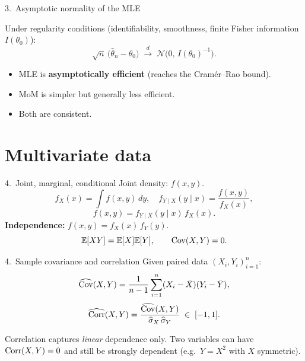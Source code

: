 \documentclass[aspectratio=169]{beamer}
\begin{document}
\begin{frame}{3.~Asymptotic normality of the MLE}
  \begin{thbox}
    Under regularity conditions (identifiability, smoothness, finite
    Fisher information $I(\theta_0)$):
    \[
      \sqrt{n}\,\bigl(\widehat{\theta}_n - \theta_0\bigr)
      \;\xrightarrow{d}\;
      \mathcal{N}\!\bigl(0,\, I(\theta_0)^{-1}\bigr).
    \]
  \end{thbox}
  \medskip
  \begin{itemize}
    \item MLE is \textbf{asymptotically efficient} (reaches the
          Cramér–Rao bound).
    \item MoM is simpler but generally less efficient.
    \item Both are consistent.
  \end{itemize}
\end{frame}

\section{Multivariate data}

\begin{frame}{4.~Joint, marginal, conditional}
  Joint density: $f(x, y)$.
  \[
    f_X(x) = \int f(x, y)\, dy, \quad
    f_{Y \mid X}(y \mid x) = \frac{f(x, y)}{f_X(x)},
  \]
  \[
    f(x, y) = f_{Y \mid X}(y \mid x)\, f_X(x).
  \]
  \medskip
  \textbf{Independence:} $f(x, y) = f_X(x)\, f_Y(y)$.
  \[
    \mathbb{E}[XY] = \mathbb{E}[X]\mathbb{E}[Y], \qquad
    \mathrm{Cov}(X, Y) = 0.
  \]
\end{frame}

\begin{frame}{4.~Sample covariance and correlation}
  Given paired data $(X_i, Y_i)_{i=1}^{n}$:
  \[
    \widehat{\mathrm{Cov}}(X, Y) = \frac{1}{n-1}\sum_{i=1}^{n}
      (X_i - \bar{X})(Y_i - \bar{Y}),
  \]
  \[
    \widehat{\mathrm{Corr}}(X, Y) =
      \frac{\widehat{\mathrm{Cov}}(X, Y)}{\widehat{\sigma}_X\, \widehat{\sigma}_Y}
      \;\in\; [-1, 1].
  \]
  \medskip
  \begin{warnbox}
    Correlation captures \emph{linear} dependence only. Two variables
    can have $\mathrm{Corr}(X, Y) = 0$ and still be strongly dependent
    (e.g.\ $Y = X^2$ with $X$ symmetric).
  \end{warnbox}
\end{frame}

\end{document}
